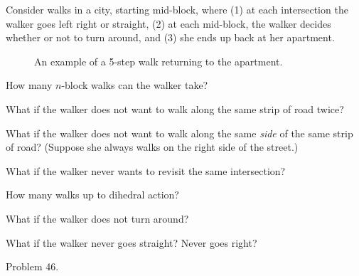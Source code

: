 \documentclass{article}
\begin{document}
Consider walks in a city, starting mid-block, where (1) at each intersection
the walker goes left right or straight, (2) at each mid-block, the walker
decides whether or not to turn around, and (3) she ends up back at her
apartment.
\begin{figure}[!h]
  \centering
  \caption{
    An example of a 5-step walk returning to the apartment.
  }
\end{figure}
\begin{question}
  How many $n$-block walks can the walker take?
\end{question}
\begin{related}
  \item What if the walker does not want to walk along the same strip of road
    twice?
  \item What if the walker does not want to walk along the same \textit{side} of
    the same strip of road? (Suppose she always walks on the right side of the
    street.)
  \item What if the walker never wants to revisit the same intersection?
  \item How many walks up to dihedral action?
  \item What if the walker does not turn around?
  \item What if the walker never goes straight? Never goes right?
\end{related}
\begin{references}
  \item Problem 46.
\end{references}
\end{document}
